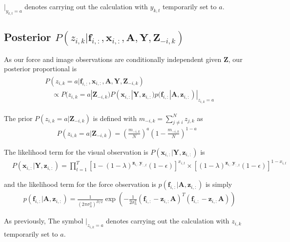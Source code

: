 \documentclass[]{article}
\begin{document}
 $|_{y_{k,t}=a}$ denotes carrying out the calculation with $y_{k,t}$ temporarily set to $a$.

\subsection{Posterior $P(z_{i,k}|\mathbf{f}_{i,:}, \mathbf{x}_{i,:}, \mathbf{A}, \mathbf{Y}, \mathbf{Z}_{-i,k})$}
As our force and image observations are conditionally independent given $\mathbf{Z}$, our posterior proportional is
	\begin{align}
		\begin{split}\label{eq:posterior_Zik}
			&P(z_{i,k}=a|\mathbf{f}_{i,:}, \mathbf{x}_{i,:}, \mathbf{A}, \mathbf{Y}, \mathbf{Z}_{-i,k}) \\
			&\quad \propto P(z_{i,k}=a| \mathbf{Z}_{-i,k}) P(\mathbf{x}_{i,:}|\mathbf{Y}, \mathbf{z}_{i,:})  p(\mathbf{f}_{i,:}|\mathbf{A}, \mathbf{z}_{i,:})|_{z_{i,k}=a} 
		\end{split}
	\end{align}

The prior $P(z_{i,k}=a| \mathbf{Z}_{-i,k})$ is defined with $m_{-i,k} = \sum_{j\not=i}^{N} z_{j,k}$ as
\begin{align}
	P(z_{i,k}=a| \mathbf{Z}_{-i,k}) = (\frac{m_{-i,k}}{N})^a (1 - \frac{m_{-i,k}}{N})^{1-a}
\end{align}


The likelihood term for the visual observation is $P(\mathbf{x}_{i,:}|\mathbf{Y}, \mathbf{z}_{i,:})$ is 
\begin{align}
	&P(\mathbf{x}_{i,:}|\mathbf{Y}, \mathbf{z}_{i,:}) = \prod_{t=1}^{T} \left[1 - (1-\lambda)^{\mathbf{z}_{i,:}\mathbf{y}_{:,t}}(1-\epsilon)\right]^{x_{i,t}} \times \left[ (1-\lambda)^{\mathbf{z}_{i,:}\mathbf{y}_{:,t}}(1-\epsilon)\right]^{1 - x_{i,t}} 
\end{align}

\noindent and the likelihood term for the force observation is $p(\mathbf{f}_{i,:}|\mathbf{A}, \mathbf{z}_{i,:})$ is simply
\begin{align}
	&p(\mathbf{f}_{i,:}|\mathbf{A}, \mathbf{z}_{i,:}) = \frac{1}{(2\pi\sigma^2_n)^{D/2}} \exp \left(-\frac{1}{2\sigma^2_n} (\mathbf{f}_{i,:} - \mathbf{z}_{i,:} \mathbf{A})^T (\mathbf{f}_{i,:} - \mathbf{z}_{i,:} \mathbf{A}) \right)
\end{align}

As previously, The symbol $|_{z_{i,k}=a}$ denotes carrying out the calculation with $z_{i,k}$ temporarily set to $a$.
\end{document}

